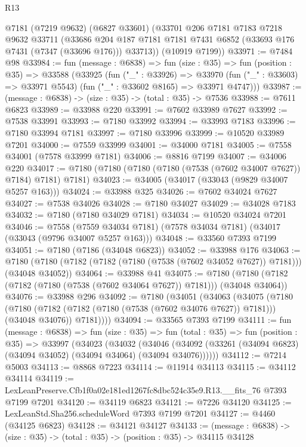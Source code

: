 \begin{lexlean}{R13}
\begin{coremodule}
      @7181
      (@7219 @9632)
      (@6827 @33601)
      (@33701
        @206
        @7181
        @7183
        @7218
        @9632
        @33711
        (@33686 @204 @187 @7181 @7181 @7431 @6852 (@33693 @176 @7431 (@7347 (@33696 @176))) @33713))
      (@10919 @7199))
@33971 := @7484 @98
@33984 := fun (message : @6838) =>
  fun (size : @35) =>
  fun (position : @35) =>
  @33588
    (@33925
      (fun ("_" : @33926) =>
      @33970 (fun ("_" : @33603) => @33971 @5543) (fun ("_" : @33602 @8165) => @33971 @4747)))
@33987 := (message : @6838) -> (size : @35) -> (total : @35) -> @7536
@33988 := @7611 @6823
@33989 := @33988 @220
@33991 := @7602 @33989 @7627
@33992 := @7538 @33991
@33993 := @7180 @33992
@33994 := @33993 @7183
@33996 := @7180 @33994 @7181
@33997 := @7180 @33996
@33999 := @10520 @33989 @7201
@34000 := @7559 @33999
@34001 := @34000 @7181
@34005 := @7558 @34001 (@7578 @33999 @7181)
@34006 := @8816 @7199
@34007 := @34006 @220
@34017 := @7180 (@7180 (@7180 (@7180 (@7538 (@7602 @34007 @7627)) @7184) @7181) @7181)
@34023 := @34005 (@34017 (@33043 (@9829 @34007 @5257 @163)))
@34024 := @33988 @325
@34026 := @7602 @34024 @7627
@34027 := @7538 @34026
@34028 := @7180 @34027
@34029 := @34028 @7183
@34032 := @7180 (@7180 @34029 @7181)
@34034 := @10520 @34024 @7201
@34046 := @7558
    (@7559 @34034 @7181)
    (@7578 @34034 @7181)
    (@34017 (@33043 (@9796 @34007 @5257 @163)))
@34048 := @33560 @7393 @7199
@34051 := @7180 (@7186 (@34048 @6823))
@34052 := @33988 @176
@34063 := @7180 (@7180 (@7182 (@7182 (@7180 (@7538 (@7602 @34052 @7627)) @7181))) (@34048 @34052))
@34064 := @33988 @41
@34075 := @7180 (@7180 (@7182 (@7182 (@7180 (@7538 (@7602 @34064 @7627)) @7181))) (@34048 @34064))
@34076 := @33988 @296
@34092 := @7180
    (@34051
      (@34063
        (@34075
          (@7180
            (@7180 (@7182 (@7182 (@7180 (@7538 (@7602 @34076 @7627)) @7181))) (@34048 @34076))
            @7181))))
@34094 := @33565 @7393 @7199
@34111 := fun (message : @6838) =>
  fun (size : @35) =>
  fun (total : @35) =>
  fun (position : @35) =>
  @33997
    (@34023
      (@34032
        (@34046 (@34092 (@33261 (@34094 @6823) (@34094 @34052) (@34094 @34064) (@34094 @34076))))))
@34112 := @7214 @5003
@34113 := @8868 @7223
@34114 := @11914 @34113
@34115 := @34112 @34114
@34119 := LexLeanPreserve.Cfb1f0a02e181ed1267fc8dbc524c35e9.R13.__fits_76 @7393 @7199 @7201
@34120 := @34119 @6823
@34121 := @7226 @34120
@34125 := LexLeanStd.Sha256.scheduleWord @7393 @7199 @7201
@34127 := @4460 (@34125 @6823)
@34128 := @34121 @34127
@34133 := (message : @6838) -> (size : @35) -> (total : @35) -> (position : @35) -> @34115 @34128

\end{coremodule}
\end{lexlean}
